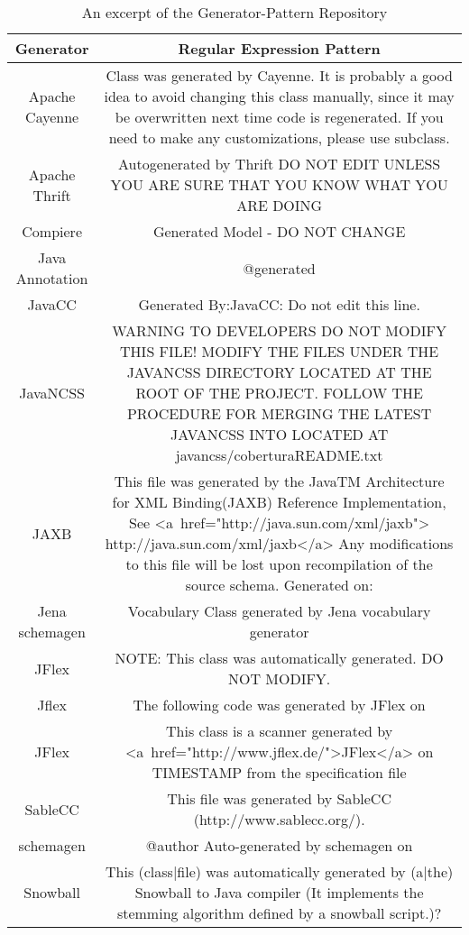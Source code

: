 \setlength{\extrarowheight}{0.2em}
\begin{table}
	\caption{An excerpt of the Generator-Pattern Repository}
	\label{table:generatorPatternRepository}
	\begin{tabularx}{\textwidth}{c|C}
		\textbf{Generator} & \textbf{Regular Expression Pattern} \\
		\hline
		Apache Cayenne & Class \class was generated by Cayenne. It is probably a good idea to avoid changing this class manually, since it may be overwritten next time code is regenerated. If you need to make any customizations, please use subclass. \\
		Apache Thrift & Autogenerated by Thrift \return DO NOT EDIT UNLESS YOU ARE SURE THAT YOU KNOW WHAT YOU ARE DOING \\
		Compiere &	Generated Model - DO NOT CHANGE \\
		Java Annotation & @generated \\
		JavaCC & Generated By:JavaCC: Do not edit this line. \\
		JavaNCSS &	WARNING TO \project DEVELOPERS \return DO NOT MODIFY THIS FILE! \return MODIFY THE FILES UNDER THE JAVANCSS DIRECTORY LOCATED AT THE ROOT OF THE \project PROJECT. FOLLOW THE PROCEDURE FOR MERGING THE LATEST JAVANCSS INTO \project LOCATED AT javancss/coberturaREADME.txt \\
		JAXB &	This file was generated by the JavaTM Architecture for XML Binding(JAXB) Reference Implementation, \version \return See <a~href="http://java.sun.com/xml/jaxb"> http://java.sun.com/xml/jaxb</a> \return Any modifications to this file will be lost upon recompilation of the source schema. Generated on: \timestamp \\
		Jena schemagen & Vocabulary Class generated by Jena vocabulary generator \\
		JFlex & NOTE: This class was automatically generated. DO NOT MODIFY. \\
		Jflex & The following code was generated by JFlex \version on \timestamp \\
		JFlex & This class is a scanner generated by <a~href="http://www.jflex.de/">JFlex</a> \version
		on {{TIMESTAMP}} from the specification file \\
		SableCC & This file was generated by SableCC (http://www.sablecc.org/). \\
		schemagen & @author Auto-generated by schemagen on \timestamp \\
		Snowball &	This (class|file) was automatically generated by (a|the) Snowball to Java compiler (\return It implements the stemming algorithm defined by a snowball script.)? \\
	\end{tabularx}
\end{table}
\setlength{\extrarowheight}{0em}